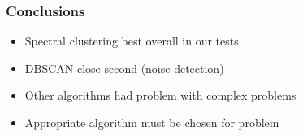 \documentclass{beamer}
\begin{document}
\begin{frame}
\frametitle{Conclusions}
    \begin{itemize}
	\item Spectral clustering best overall in our tests
    	\item DBSCAN close second (noise detection)
	\item Other algorithms had problem with complex problems

   	\item Appropriate algorithm must be chosen for problem
    \end{itemize}
\end{frame}
\end{document}
